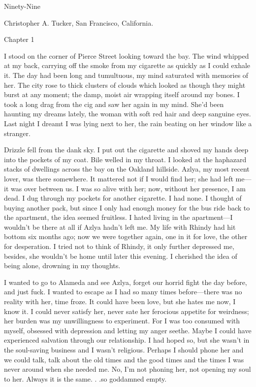 Ninety-Nine

Christopher A. Tucker, San Francisco, California.

Chapter 1

I stood on the corner of Pierce Street looking toward the bay. The wind
whipped at my back, carrying off the smoke from my cigarette as quickly
as I could exhale it. The day had been long and tumultuous, my mind
saturated with memories of her. The city rose to thick clusters of
clouds which looked as though they might burst at any moment; the damp,
moist air wrapping itself around my bones. I took a long drag from the
cig and saw her again in my mind. She'd been haunting my dreams lately,
the woman with soft red hair and deep sanguine eyes. Last night I dreamt
I was lying next to her, the rain beating on her window like a stranger.

Drizzle fell from the dank sky. I put out the cigarette and shoved my
hands deep into the pockets of my coat. Bile welled in my throat. I
looked at the haphazard stacks of dwellings across the bay on the
Oakland hillside. Azlya, my most recent lover, was there somewhere. It
mattered not if I would find her; she had left me---it was over between
us. I was so alive with her; now, without her presence, I am dead. I dug
through my pockets for another cigarette. I had none. I thought of
buying another pack, but since I only had enough money for the bus ride
back to the apartment, the idea seemed fruitless. I hated living in the
apartment---I wouldn't be there at all if Azlya hadn't left me. My life
with Rhindy had hit bottom six months ago; now we were together again,
one in it for love, the other for desperation. I tried not to think of
Rhindy, it only further depressed me, besides, she wouldn't be home
until later this evening. I cherished the idea of being alone, drowning
in my thoughts.

I wanted to go to Alameda and see Azlya, forget our horrid fight the day
before, and just fuck. I wanted to escape as I had so many times
before---there was no reality with her, time froze. It could have been
love, but she hates me now, I know it. I could never satisfy her, never
sate her ferocious appetite for weirdness; her burden was my
unwillingness to experiment. For I was too consumed with myself,
obsessed with depression and letting my anger seethe. Maybe I could have
experienced salvation through our relationship. I had hoped so, but she
wasn't in the soul-saving business and I wasn't religious. Perhaps I
should phone her and we could talk, talk about the old times and the
good times and the times I was never around when she needed me. No, I'm
not phoning her, not opening my soul to her. Always it is the same. .
.so goddamned empty.

